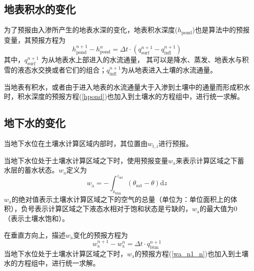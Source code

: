 \subsection{地表积水的变化}
为了预报由入渗所产生的地表水深的变化，地表积水深度($h_{\mathrm{pond}}$)也是算法中的预报变量，其预报方程为
\begin{equation}\label{hpond}
  h_{\mathrm{ {pond }}}^{n+1}-h_{\mathrm{ {pond }}}^{n}=\Delta t \cdot\left(q_{\mathrm{ {surf }}}^{n+1}-q_{\mathrm{ {infl }}}^{n+1}\right)
\end{equation}
其中，$q_{\mathrm{surf}}^{n+1} $ 为从地表水上部进入的水流通量，
其可以是降水、蒸发、地表水与积雪的液态水交换或者它们的组合；$q_{\mathrm{infl}}^{n+1}$为从地表进入土壤的水流通量。


当地表有积水，或者由于进入地表的水流通量大于入渗到土壤中的通量而形成积水时，积水深度的预报方程(\ref{hpond})也加入到土壤水的方程组中，进行统一求解。


\subsection{地下水的变化}
当地下水位在土壤水计算区域内部时，其位置由$w_{\mathrm{t},i}$进行预报。

当地下水位处于土壤水计算区域之下时，使用预报变量$w_{\mathrm {a}} $来表示计算区域之下蓄水层的蓄水状态。$w_{\mathrm {a}} $定义为
\begin{equation}
  w_{\mathrm{a}}=-\int_{\mathrm{z_{\mathrm{btm}}}}^{z_{\mathrm{wt}}}\left(\theta_{\mathrm{sat}}-\theta\right){\mathrm { d}} z
\end{equation}
$w_{\mathrm {a}} $的绝对值表示土壤水计算区域之下的空气的总量（单位为：单位面积上的体积），负号表示计算区域之下液态水相对于饱和状态是亏缺的，$w_{\mathrm {a}} $的最大值为0（表示土壤水饱和）。

在垂直方向上，描述$w_{\mathrm {a}} $变化的预报方程为
\begin{equation}\label{wa_n1_n}
  w_{\mathrm{a}}^{n+1}-w_{\mathrm{a}}^{n}=\Delta t \cdot q_{\mathrm{b t m}}^{n+1}
\end{equation}
当地下水位处于土壤水计算区域之下时，$w_{\mathrm {a}} $的预报方程(\ref{wa_n1_n})也加入到土壤水的方程组中，进行统一求解。

